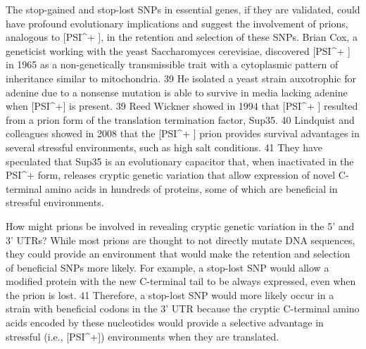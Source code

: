 The stop-gained and stop-lost SNPs in essential genes, if they are validated, could have profound evolutionary implications and suggest the involvement of prions, analogous to [PSI^+ ], in the retention and selection of these SNPs.  Brian Cox, a geneticist working with the yeast Saccharomyces cerevisiae, discovered [PSI^+ ] in 1965 as a non-genetically transmissible trait with a cytoplasmic pattern of inheritance similar to mitochondria. 39 He isolated a yeast strain auxotrophic for adenine due to a nonsense mutation is able to survive in media lacking adenine when [PSI^+] is present. 39 Reed Wickner showed in 1994 that [PSI^+ ] resulted from a prion form of the translation termination factor, Sup35. 40 Lindquist and colleagues showed in 2008 that the [PSI^+ ] prion provides survival advantages in several stressful environments, such as high salt conditions. 41 They have speculated that Sup35 is an evolutionary capacitor that, when inactivated in the PSI^+ form, releases cryptic genetic variation that allow expression of novel C-terminal amino acids in hundreds of proteins, some of which are beneficial in stressful environments. 

How might prions be involved in revealing cryptic genetic variation in the 5' and 3' UTRs? While most prions are thought to not directly mutate DNA sequences, they could provide an environment that would make the retention and selection of beneficial SNPs more likely. For example, a stop-lost SNP would allow a modified protein with the new C-terminal tail to be always expressed, even when the prion is lost. 41 Therefore, a stop-lost SNP would more likely occur in a strain with beneficial codons in the 3' UTR because the cryptic C-terminal amino acids encoded by these nucleotides would provide a selective advantage in stressful (i.e., [PSI^+]) environments when they are translated.

